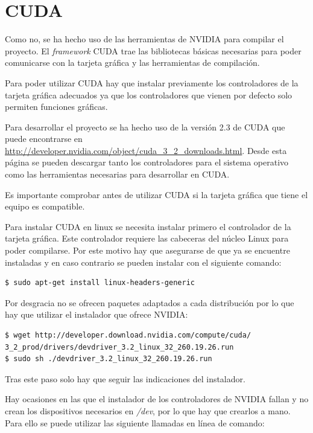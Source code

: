 \section{CUDA}

Como no, se ha hecho uso de las herramientas de NVIDIA para compilar el proyecto. El \emph{framework} CUDA trae las bibliotecas básicas necesarias para poder comunicarse con la tarjeta gráfica y las herramientas de compilación.

Para poder utilizar CUDA hay que instalar previamente los controladores de la tarjeta gráfica adecuados ya que los controladores que vienen por defecto solo permiten funciones gráficas.

Para desarrollar el proyecto se ha hecho uso de la versión 2.3 de CUDA que puede encontrarse en \url{http://developer.nvidia.com/object/cuda_3_2_downloads.html}. Desde esta página se pueden descargar tanto los controladores para el sistema operativo como las herramientas necesarias para desarrollar en CUDA.

Es importante comprobar antes de utilizar CUDA si la tarjeta gráfica que tiene el equipo es compatible.

Para instalar CUDA en linux se necesita instalar primero el controlador de la tarjeta gráfica. Este controlador requiere las cabeceras del núcleo Linux para poder compilarse. Por este motivo hay que asegurarse de que ya se encuentre instaladas y en caso contrario se pueden instalar con el siguiente comando:

\begin{verbatim}
$ sudo apt-get install linux-headers-generic
\end{verbatim}

Por desgracia no se ofrecen paquetes adaptados a cada distribución por lo que hay que utilizar el instalador que ofrece NVIDIA:

\begin{verbatim}
$ wget http://developer.download.nvidia.com/compute/cuda/
3_2_prod/drivers/devdriver_3.2_linux_32_260.19.26.run
$ sudo sh ./devdriver_3.2_linux_32_260.19.26.run
\end{verbatim}

Tras este paso solo hay que seguir las indicaciones del instalador.

Hay ocasiones en las que el instalador de los controladores de NVIDIA fallan y no crean los dispositivos necesarios en \emph{/dev}, por lo que hay que crearlos a mano. Para ello se puede utilizar las siguiente llamadas en línea de comando:

